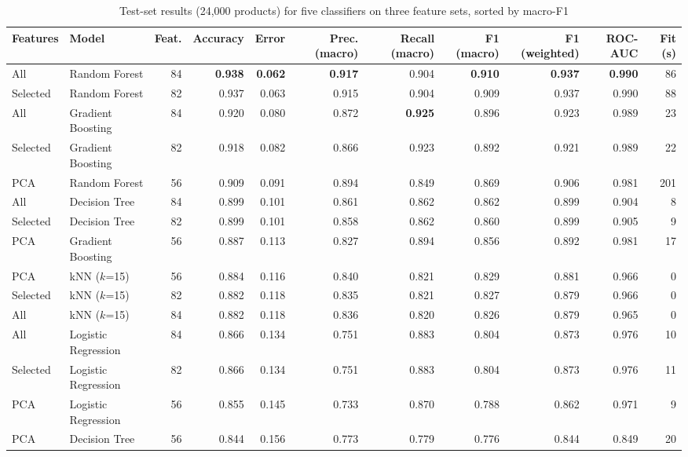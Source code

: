 \documentclass[conference]{IEEEtran}
\begin{document}
\begin{table}[t]
\centering
\caption{Test-set results (24,000 products) for five classifiers on three feature sets, sorted by macro-F1}
\label{tab:models}
\setlength{\tabcolsep}{4.5pt}
\begin{tabular}{llrrrrrrrrr}
\toprule
Features & Model & Feat. & Accuracy & Error & Prec. (macro) & Recall (macro) & F1 (macro) & F1 (weighted) & ROC-AUC & Fit (s) \\
\midrule
All & Random Forest & 84 & \textbf{0.938} & \textbf{0.062} & \textbf{0.917} & 0.904 & \textbf{0.910} & \textbf{0.937} & \textbf{0.990} & 86 \\
Selected & Random Forest & 82 & 0.937 & 0.063 & 0.915 & 0.904 & 0.909 & 0.937 & 0.990 & 88 \\
All & Gradient Boosting & 84 & 0.920 & 0.080 & 0.872 & \textbf{0.925} & 0.896 & 0.923 & 0.989 & 23 \\
Selected & Gradient Boosting & 82 & 0.918 & 0.082 & 0.866 & 0.923 & 0.892 & 0.921 & 0.989 & 22 \\
PCA & Random Forest & 56 & 0.909 & 0.091 & 0.894 & 0.849 & 0.869 & 0.906 & 0.981 & 201 \\
All & Decision Tree & 84 & 0.899 & 0.101 & 0.861 & 0.862 & 0.862 & 0.899 & 0.904 & 8 \\
Selected & Decision Tree & 82 & 0.899 & 0.101 & 0.858 & 0.862 & 0.860 & 0.899 & 0.905 & 9 \\
PCA & Gradient Boosting & 56 & 0.887 & 0.113 & 0.827 & 0.894 & 0.856 & 0.892 & 0.981 & 17 \\
PCA & kNN ($k$=15) & 56 & 0.884 & 0.116 & 0.840 & 0.821 & 0.829 & 0.881 & 0.966 & 0 \\
Selected & kNN ($k$=15) & 82 & 0.882 & 0.118 & 0.835 & 0.821 & 0.827 & 0.879 & 0.966 & 0 \\
All & kNN ($k$=15) & 84 & 0.882 & 0.118 & 0.836 & 0.820 & 0.826 & 0.879 & 0.965 & 0 \\
All & Logistic Regression & 84 & 0.866 & 0.134 & 0.751 & 0.883 & 0.804 & 0.873 & 0.976 & 10 \\
Selected & Logistic Regression & 82 & 0.866 & 0.134 & 0.751 & 0.883 & 0.804 & 0.873 & 0.976 & 11 \\
PCA & Logistic Regression & 56 & 0.855 & 0.145 & 0.733 & 0.870 & 0.788 & 0.862 & 0.971 & 9 \\
PCA & Decision Tree & 56 & 0.844 & 0.156 & 0.773 & 0.779 & 0.776 & 0.844 & 0.849 & 20 \\
\bottomrule
\end{tabular}
\end{table}
\end{document}
